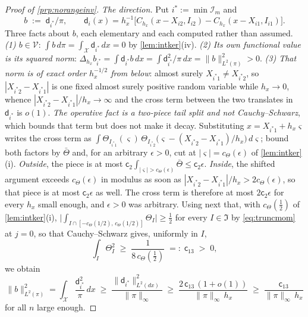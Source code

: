 \begin{proof}[Proof of \cref{prp:norangeinv}]
\emph{The direction.} Put $i^\ast:=\min\mathcal I_m$ and
\[
b\;:=\;\mathsf d_{i^\ast}/\pi ,
\qquad
\mathsf d_{i}(x)=h_x^{-1}\big[C_{h_x}(x-X_{i2},I_{i2})-C_{h_x}(x-X_{i1},I_{i1})\big] .
\]
Three facts about $b$, each elementary and each computed rather than assumed. \emph{(1) $b\in\mathcal V$}:
$\int b\,d\pi=\int_{\mathcal X}\mathsf d_{i^\ast}\,dx=0$ by \cref{lem:intker}(iv). \emph{(2) Its own
functional value is its squared norm}:
$\Delta_{h_x}b_{i^\ast}=\int\mathsf d_{i^\ast}b\,dx=\int\mathsf d_{i^\ast}^{2}/\pi\,dx=\|b\|_{L^{2}(\pi)}^{2}>0$.
\emph{(3) That norm is of exact order $h_x^{-1/2}$ from below}: almost surely $X_{i^\ast1}\ne X_{i^\ast2}$,
so $|X_{i^\ast2}-X_{i^\ast1}|$ is one fixed almost surely positive random variable while $h_x\to0$,
whence $|X_{i^\ast2}-X_{i^\ast1}|/h_x\to\infty$ and the cross term between the two translates in
$\mathsf d_{i^\ast}$ is $o(1)$. \emph{The operative fact is a two-piece tail split and not
Cauchy--Schwarz}, which bounds that term but does not make it decay. Substituting
$x=X_{i^\ast1}+h_x\varsigma$ writes the cross term as
$\int\Theta_{I_{i^\ast1}}(\varsigma)\,\Theta_{I_{i^\ast2}}\big(\varsigma-(X_{i^\ast2}-X_{i^\ast1})/h_x\big)\,d\varsigma$;
bound both factors by $\bar\Theta$ and, for an arbitrary $\epsilon>0$, cut at
$|\varsigma|=c_\Theta(\epsilon)$ of \cref{lem:intker}(i).
\emph{Outside}, the piece is at most
$\mathsf c_2\int_{|\varsigma|>c_\Theta(\epsilon)}\bar\Theta\le\mathsf c_2\epsilon$. \emph{Inside}, the
shifted argument exceeds $c_\Theta(\epsilon)$ in modulus as soon as
$|X_{i^\ast2}-X_{i^\ast1}|/h_x>2c_\Theta(\epsilon)$, so that piece is at most $\mathsf c_2\epsilon$ as
well. The cross term is therefore at most $2\mathsf c_2\epsilon$ for every $h_x$ small enough, and
$\epsilon>0$ was arbitrary. Using next that, with
$c_\Theta(\tfrac12)$ of \cref{lem:intker}(i),
$\big|\int_{I\cap[-c_\Theta(1/2),\,c_\Theta(1/2)]}\Theta_I\big|\ge\tfrac12$ for every $I\in\mathfrak I$
by \eqref{eq:truncmom} at $j=0$, so that Cauchy--Schwarz gives, uniformly in $I$,
\begin{equation}\label{eq:thetasqlb}
\int_I\Theta_I^{2}\;\ge\;\frac{1}{8\,c_\Theta(\tfrac12)}\;=:\;\mathsf c_{13}\;>\;0 ,
\end{equation}
we obtain
\[
\|b\|^{2}_{L^{2}(\pi)}=\int_{\mathcal X}\frac{\mathsf d_{i^\ast}^{2}}{\pi}\,dx
\;\ge\;\frac{\|\mathsf d_{i^\ast}\|^{2}_{L^{2}(dx)}}{\|\pi\|_\infty}
\;\ge\;\frac{2\,\mathsf c_{13}\,(1+o(1))}{\|\pi\|_\infty\,h_x}
\;\ge\;\frac{\mathsf c_{13}}{\|\pi\|_\infty\,h_x}
\]
for all $n$ large enough.

\end{proof}
